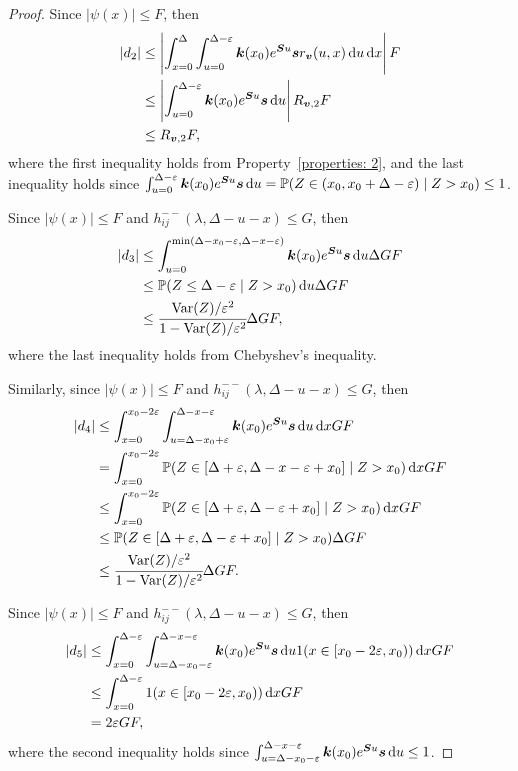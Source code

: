\begin{proof}
	Since \(|\psi(x)|\leq F\), then
	\begin{align}
		|d_2| &\leq \left| \int_{x=0}^{\Delta}\int_{u=0}^{\Delta-\varepsilon} \boldsymbol k(x_0)e^{\boldsymbol Su}\boldsymbol s r_{\boldsymbol v}(u,x) \, \mathrm{d} u \, \mathrm{d} x \right|F
		\\&\leq \left| \int_{u=0}^{\Delta-\varepsilon} \boldsymbol k(x_0)e^{\boldsymbol Su}\boldsymbol s  \, \mathrm{d} u \right|R_{\boldsymbol v,2}F
		\\&\leq R_{\boldsymbol v,2}F,
	\end{align}
	where the first inequality holds from Property~\ref{properties: 2}, and the last inequality holds since \(\int_{u=0}^{\Delta-\varepsilon} \boldsymbol k(x_0)e^{\boldsymbol Su}\boldsymbol s  \, \mathrm{d} u=\mathbb P(Z\in (x_0,x_0+\Delta-\varepsilon)\mid Z>x_0)\leq 1\). 
	
	Since \(|\psi(x)|\leq F\) and \(h_{ij}^{--}(\lambda,\Delta-u-x)\leq G\), then
	\begin{align}
		|d_3|&\leq \int_{u=0}^{\min(\Delta-x_0-\varepsilon,\Delta-x-\varepsilon)} \boldsymbol k(x_0)e^{\boldsymbol Su}\boldsymbol s \, \mathrm{d} u \Delta GF
		\\ &\leq \mathbb P(Z\leq\Delta-\varepsilon \mid Z>x_0) \, \mathrm{d} u \Delta GF\nonumber
		\\ &\leq \cfrac{\mathrm{Var}(Z)/\varepsilon^2}{1-\mathrm{Var}(Z)/\varepsilon^2} \Delta GF,\nonumber
	\end{align}
	where the last inequality holds from Chebyshev's inequality. 
	
	Similarly, since \(|\psi(x)|\leq F\) and \(h_{ij}^{--}(\lambda,\Delta-u-x)\leq G\), then
	\begin{align} 
		|d_4|&\leq \int_{x=0}^{x_0-2\varepsilon}\int_{u=\Delta-x_0+\varepsilon}^{\Delta-x-\varepsilon} \boldsymbol k(x_0)e^{\boldsymbol Su}\boldsymbol s \, \mathrm{d} u \, \mathrm{d} x GF \nonumber
			\\& = \int_{x=0}^{x_0-2\varepsilon}\mathbb P(Z\in[\Delta+\varepsilon, \Delta-x-\varepsilon + x_0]\mid Z>x_0) \, \mathrm{d} x GF \nonumber
			\\& \leq \int_{x=0}^{x_0-2\varepsilon}\mathbb P(Z\in[\Delta+\varepsilon, \Delta-\varepsilon + x_0]\mid Z>x_0) \, \mathrm{d} x GF \nonumber
			\\& \leq \mathbb P(Z\in[\Delta+\varepsilon, \Delta-\varepsilon + x_0]\mid Z>x_0)  \Delta GF \nonumber
			\\& \leq \cfrac{\mathrm{Var}(Z)/\varepsilon^2}{1-\mathrm{Var}(Z)/\varepsilon^2} \Delta GF. \nonumber
	\end{align}

	Since \(|\psi(x)|\leq F\) and \(h_{ij}^{--}(\lambda,\Delta-u-x)\leq G\), then
	\begin{align} 
		|d_5|&\leq \int_{x=0}^{\Delta-\varepsilon}\int_{u=\Delta-x_0-\varepsilon}^{\Delta-x-\varepsilon} \boldsymbol k(x_0)e^{\boldsymbol Su}\boldsymbol s \, \mathrm{d} u 1(x\in[x_0-2\varepsilon,x_0))\, \mathrm{d} xGF
		\\&\leq \int_{x=0}^{\Delta-\varepsilon} 1(x\in[x_0-2\varepsilon,x_0))\, \mathrm{d} xGF  \nonumber 
		\\&= 2\varepsilon GF,  \nonumber 
	\end{align}
	where the second inequality holds since \(\int_{u=\Delta-x_0-\varepsilon}^{\Delta-x-\varepsilon} \boldsymbol k(x_0)e^{\boldsymbol Su}\boldsymbol s \, \mathrm{d} u\leq 1\).
	

\end{proof}
